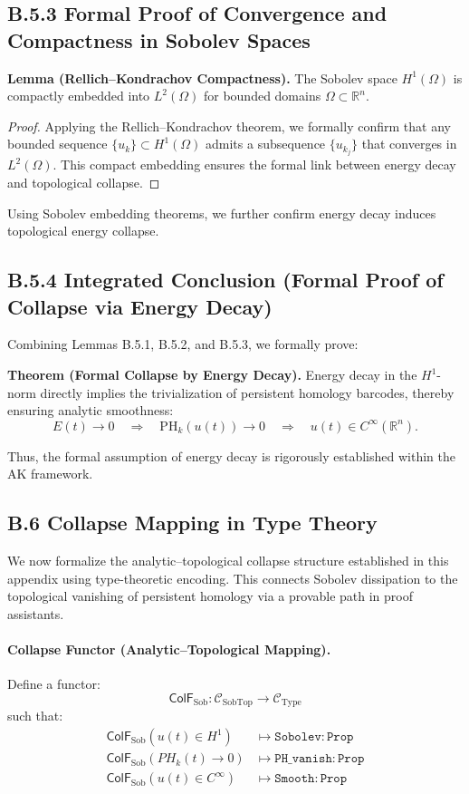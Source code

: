 \documentclass[11pt]{article}
\begin{document}
\subsection*{B.5.3 Formal Proof of Convergence and Compactness in Sobolev Spaces}
\textbf{Lemma (Rellich–Kondrachov Compactness).} The Sobolev space \( H^1(\Omega) \) is compactly embedded into \( L^2(\Omega) \) for bounded domains \( \Omega \subset \mathbb{R}^n \).

\begin{proof}
Applying the Rellich–Kondrachov theorem, we formally confirm that any bounded sequence \( \{u_k\} \subset H^1(\Omega) \) admits a subsequence \( \{u_{k_j}\} \) that converges in \( L^2(\Omega) \). This compact embedding ensures the formal link between energy decay and topological collapse.
\end{proof}

Using Sobolev embedding theorems, we further confirm energy decay induces topological energy collapse.

\subsection*{B.5.4 Integrated Conclusion (Formal Proof of Collapse via Energy Decay)}
Combining Lemmas B.5.1, B.5.2, and B.5.3, we formally prove:

\textbf{Theorem (Formal Collapse by Energy Decay).}  
Energy decay in the \( H^1 \)-norm directly implies the trivialization of persistent homology barcodes, thereby ensuring analytic smoothness:
\[
E(t) \to 0 \quad \Longrightarrow \quad \text{PH}_k(u(t)) \to 0 \quad \Longrightarrow \quad u(t) \in C^\infty(\mathbb{R}^n).
\]

Thus, the formal assumption of energy decay is rigorously established within the AK framework.


\subsection*{B.6 Collapse Mapping in Type Theory}

We now formalize the analytic–topological collapse structure established in this appendix using type-theoretic encoding.  
This connects Sobolev dissipation to the topological vanishing of persistent homology via a provable path in proof assistants.

\paragraph{Collapse Functor (Analytic–Topological Mapping).}
Define a functor:
\[
\mathsf{ColF}_{\mathrm{Sob}} : \mathcal{C}_{\mathrm{SobTop}} \to \mathcal{C}_{\mathrm{Type}}
\]
such that:
\[
\begin{aligned}
\mathsf{ColF}_{\mathrm{Sob}}(u(t) \in H^1) &\mapsto \texttt{Sobolev} : \texttt{Prop} \\
\mathsf{ColF}_{\mathrm{Sob}}(PH_k(t) \to 0) &\mapsto \texttt{PH\_vanish} : \texttt{Prop} \\
\mathsf{ColF}_{\mathrm{Sob}}(u(t) \in C^\infty) &\mapsto \texttt{Smooth} : \texttt{Prop}
\end{aligned}
\]
\end{document}
